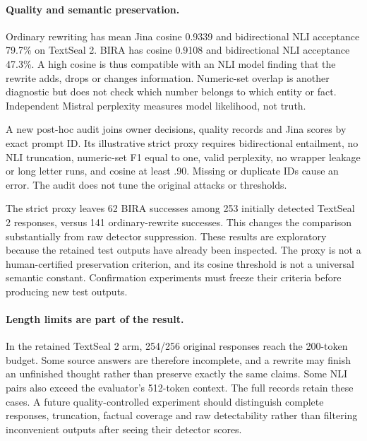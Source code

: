 \paragraph{Quality and semantic preservation.} Ordinary rewriting has mean Jina cosine 0.9339 and bidirectional NLI acceptance 79.7\% on TextSeal 2. BIRA has cosine 0.9108 and bidirectional NLI acceptance 47.3\%. A high cosine is thus compatible with an NLI model finding that the rewrite adds, drops or changes information. Numeric-set overlap is another diagnostic but does not check which number belongs to which entity or fact. Independent Mistral perplexity measures model likelihood, not truth.

A new post-hoc audit joins owner decisions, quality records and Jina scores by exact prompt ID. Its illustrative strict proxy requires bidirectional entailment, no NLI truncation, numeric-set F1 equal to one, valid perplexity, no wrapper leakage or long letter runs, and cosine at least .90. Missing or duplicate IDs cause an error. The audit does not tune the original attacks or thresholds.



The strict proxy leaves 62 BIRA successes among 253 initially detected TextSeal 2 responses, versus 141 ordinary-rewrite successes. This changes the comparison substantially from raw detector suppression. These results are exploratory because the retained test outputs have already been inspected. The proxy is not a human-certified preservation criterion, and its cosine threshold is not a universal semantic constant. Confirmation experiments must freeze their criteria before producing new test outputs.



\paragraph{Length limits are part of the result.} In the retained TextSeal 2 arm, 254/256 original responses reach the 200-token budget. Some source answers are therefore incomplete, and a rewrite may finish an unfinished thought rather than preserve exactly the same claims. Some NLI pairs also exceed the evaluator's 512-token context. The full records retain these cases. A future quality-controlled experiment should distinguish complete responses, truncation, factual coverage and raw detectability rather than filtering inconvenient outputs after seeing their detector scores.


